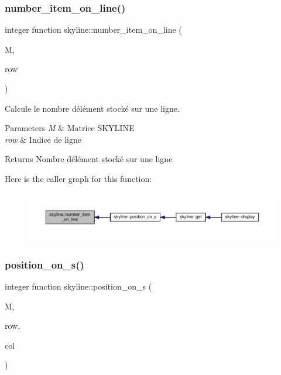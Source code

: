 \subsubsection{\texorpdfstring{number\+\_\+item\+\_\+on\+\_\+line()}{number\_item\_on\_line()}}
{\footnotesize\ttfamily integer function skyline\+::number\+\_\+item\+\_\+on\+\_\+line (\begin{DoxyParamCaption}\item[{class(\hyperlink{structskyline_1_1skyline__matrix}{skyline\+\_\+matrix}), intent(in)}]{M,  }\item[{integer, intent(in)}]{row }\end{DoxyParamCaption})}



Calcule le nombre d\textquotesingle{}élément stocké sur une ligne. 


\begin{DoxyParams}{Parameters}
{\em M} & Matrice S\+K\+Y\+L\+I\+NE \\
\hline
{\em row} & Indice de ligne \\
\hline
\end{DoxyParams}
\begin{DoxyReturn}{Returns}
Nombre d\textquotesingle{}élément stocké sur une ligne 
\end{DoxyReturn}
Here is the caller graph for this function\+:\nopagebreak
\begin{figure}[H]
\begin{center}
\leavevmode
\includegraphics[width=350pt]{namespaceskyline_a9f07218be321c12bea1d84f6b629e346_icgraph}
\end{center}
\end{figure}
\mbox{\label{namespaceskyline_a25b1e027d99abb67ab844d7b657a5843}} 
\subsubsection{\texorpdfstring{position\+\_\+on\+\_\+s()}{position\_on\_s()}}
{\footnotesize\ttfamily integer function skyline\+::position\+\_\+on\+\_\+s (\begin{DoxyParamCaption}\item[{class(\hyperlink{structskyline_1_1skyline__matrix}{skyline\+\_\+matrix}), intent(in)}]{M,  }\item[{integer, intent(in)}]{row,  }\item[{integer, intent(in)}]{col }\end{DoxyParamCaption})}



